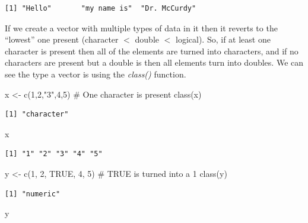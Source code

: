 \documentclass[
  letterpaper,
  DIV=11,
  numbers=noendperiod]{scrreprt}
\newenvironment{Shaded}{\begin{snugshade}}{\end{snugshade}}
\newcommand{\CommentTok}[1]{\textcolor[rgb]{0.37,0.37,0.37}{#1}}
\newcommand{\ConstantTok}[1]{\textcolor[rgb]{0.56,0.35,0.01}{#1}}
\newcommand{\DecValTok}[1]{\textcolor[rgb]{0.68,0.00,0.00}{#1}}
\newcommand{\FunctionTok}[1]{\textcolor[rgb]{0.28,0.35,0.67}{#1}}
\newcommand{\NormalTok}[1]{\textcolor[rgb]{0.00,0.23,0.31}{#1}}
\newcommand{\OtherTok}[1]{\textcolor[rgb]{0.00,0.23,0.31}{#1}}
\newcommand{\StringTok}[1]{\textcolor[rgb]{0.13,0.47,0.30}{#1}}
\begin{document}
\begin{verbatim}
[1] "Hello"       "my name is"  "Dr. McCurdy"
\end{verbatim}

If we create a vector with multiple types of data in it then it reverts
to the ``lowest'' one present (character \(<\) double \(<\) logical).
So, if at least one character is present then all of the elements are
turned into characters, and if no characters are present but a double is
then all elements turn into doubles. We can see the type a vector is
using the \emph{class()} function.

\begin{Shaded}
\begin{Highlighting}[]
\NormalTok{x }\OtherTok{\textless{}{-}} \FunctionTok{c}\NormalTok{(}\DecValTok{1}\NormalTok{,}\DecValTok{2}\NormalTok{,}\StringTok{"3"}\NormalTok{,}\DecValTok{4}\NormalTok{,}\DecValTok{5}\NormalTok{) }\CommentTok{\# One character is present}
\FunctionTok{class}\NormalTok{(x)}
\end{Highlighting}
\end{Shaded}

\begin{verbatim}
[1] "character"
\end{verbatim}

\begin{Shaded}
\begin{Highlighting}[]
\NormalTok{x}
\end{Highlighting}
\end{Shaded}

\begin{verbatim}
[1] "1" "2" "3" "4" "5"
\end{verbatim}

\begin{Shaded}
\begin{Highlighting}[]
\NormalTok{y }\OtherTok{\textless{}{-}} \FunctionTok{c}\NormalTok{(}\DecValTok{1}\NormalTok{, }\DecValTok{2}\NormalTok{, }\ConstantTok{TRUE}\NormalTok{, }\DecValTok{4}\NormalTok{, }\DecValTok{5}\NormalTok{) }\CommentTok{\# TRUE is turned into a 1}
\FunctionTok{class}\NormalTok{(y)}
\end{Highlighting}
\end{Shaded}

\begin{verbatim}
[1] "numeric"
\end{verbatim}

\begin{Shaded}
\begin{Highlighting}[]
\NormalTok{y}
\end{Highlighting}
\end{Shaded}
\end{document}
